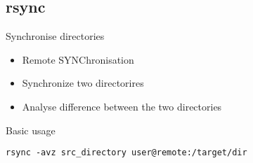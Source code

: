 \subsection{rsync}

\begin{frame}[fragile]{Synchronise directories}
  \begin{itemize}
    \pause \item Remote SYNChronisation
    \pause \item Synchronize two directorires
    \pause \item Analyse difference between the two directories
  \end{itemize}
  \pause

  \begin{exampleblock}{Basic usage}
    \begin{lstlisting}[showstringspaces=false,basicstyle=\tiny]
rsync -avz src_directory user@remote:/target/dir
    \end{lstlisting}
  \end{exampleblock}
\end{frame}
